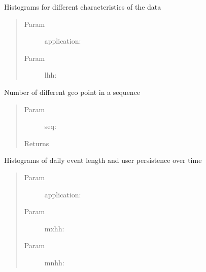\documentclass[letterpaper,10pt,english]{sphinxmanual}
\begin{document}
\begin{fulllineitems}
\label{index:SuperHubProcessing.dataHistograms}
Histograms for different characteristics of the data
\begin{quote}\begin{description}
\item[{Param }] \leavevmode
application:

\item[{Param }] \leavevmode
lhh:

\end{description}\end{quote}

\end{fulllineitems}


\begin{fulllineitems}
\label{index:SuperHubProcessing.diffItems}
Number of different geo point in a sequence
\begin{quote}\begin{description}
\item[{Param }] \leavevmode
seq:

\item[{Returns}] \leavevmode


\end{description}\end{quote}

\end{fulllineitems}


\begin{fulllineitems}
\label{index:SuperHubProcessing.eventHistograms}
Histograms of daily event length and user persistence over time
\begin{quote}\begin{description}
\item[{Param }] \leavevmode
application:

\item[{Param }] \leavevmode
mxhh:

\item[{Param }] \leavevmode
mnhh:

\end{description}\end{quote}

\end{fulllineitems}
\end{document}
